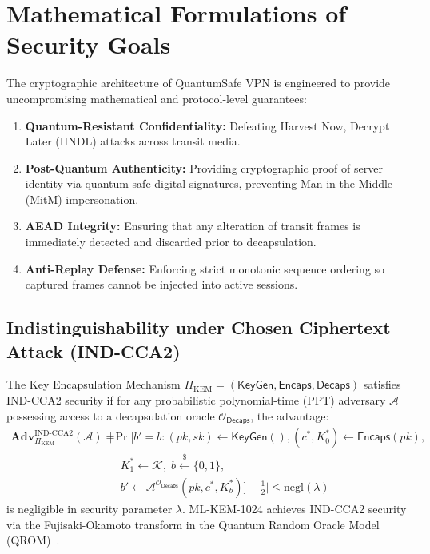 \section{Mathematical Formulations of Security Goals}
\label{sec:math_formulations_security}
\label{sec:security_objectives}

The cryptographic architecture of QuantumSafe VPN is engineered to provide uncompromising mathematical and protocol-level guarantees:
\begin{enumerate}
    \item \textbf{Quantum-Resistant Confidentiality:} Defeating Harvest Now, Decrypt Later (HNDL) attacks across transit media.
    \item \textbf{Post-Quantum Authenticity:} Providing cryptographic proof of server identity via quantum-safe digital signatures, preventing Man-in-the-Middle (MitM) impersonation.
    \item \textbf{AEAD Integrity:} Ensuring that any alteration of transit frames is immediately detected and discarded prior to decapsulation.
    \item \textbf{Anti-Replay Defense:} Enforcing strict monotonic sequence ordering so captured frames cannot be injected into active sessions.
\end{enumerate}

\subsection{Indistinguishability under Chosen Ciphertext Attack (IND-CCA2)}
The Key Encapsulation Mechanism $\Pi_{\text{KEM}} = (\mathsf{KeyGen}, \mathsf{Encaps}, \mathsf{Decaps})$ satisfies IND-CCA2 security if for any probabilistic polynomial-time (PPT) adversary $\mathcal{A}$ possessing access to a decapsulation oracle $\mathcal{O}_{\mathsf{Decaps}}$, the advantage:
\begin{equation}
\begin{split}
\mathbf{Adv}_{\Pi_{\text{KEM}}}^{\text{IND-CCA2}}(\mathcal{A}) = {} & \Bigg| \Pr\Big[b' = b : (pk, sk) \leftarrow \mathsf{KeyGen}(), (c^*, K_0^*) \leftarrow \mathsf{Encaps}(pk), \\
& \quad K_1^* \leftarrow \mathcal{K}, \; b \stackrel{\$}{\leftarrow} \{0, 1\}, \\
& \quad b' \leftarrow \mathcal{A}^{\mathcal{O}_{\mathsf{Decaps}}}(pk, c^*, K_b^*)\Big] - \frac{1}{2} \Bigg| \le \text{negl}(\lambda)
\end{split}
\end{equation}
is negligible in security parameter $\lambda$. ML-KEM-1024 achieves IND-CCA2 security via the Fujisaki-Okamoto transform in the Quantum Random Oracle Model (QROM)~\cite{kyber2022specs,nist_fips_203}.


